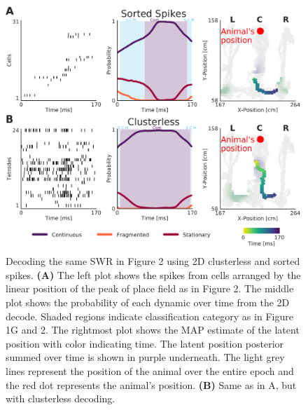 \documentclass[times, twoside]{zHenriquesLab-StyleBioRxiv}
\begin{document}
\begin{figure}%
\centering
\includegraphics[width=0.80\linewidth]{figures/Figure2-supplemental1/Figure2_v3-supplemental1}
\caption{Decoding the same SWR in Figure 2 using 2D clusterless and sorted spikes. \textbf{(A)} The left plot shows the spikes from cells arranged by the linear position of the peak of place field as in Figure 2. The middle plot shows the probability of each dynamic over time from the 2D decode. Shaded regions indicate classification category as in Figure 1G and 2. The rightmost plot shows the MAP estimate of the latent position with color indicating time. The latent position posterior summed over time is shown in purple underneath. The light grey lines represent the position of the animal over the entire epoch and the red dot represents the animal's position. \textbf{(B)} Same as in A, but with clusterless decoding.}
\label{fig:Figure2-Figure supplement 1}
\end{figure}
\end{document}
